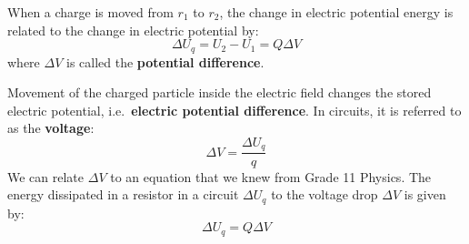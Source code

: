 \begin{figure}[ht]
  \centering
\end{figure}
When a charge is moved from $r_1$ to $r_2$, the change in electric potential
energy is related to the change in electric potential by:
\begin{equation}
  \Delta U_q=U_2-U_1=Q\Delta V
\end{equation}
where $\Delta V$ is called the \textbf{potential difference}.
  


Movement of the charged particle inside the electric field changes the
stored electric potential, i.e.\ \textbf{electric potential difference}. In
circuits, it is referred to as the \textbf{voltage}:
\begin{equation}
  \boxed{\Delta V=\frac{\Delta U_q}q}
\end{equation}
We can relate $\Delta V$ to an equation that we knew from Grade 11 Physics.
The energy dissipated in a resistor in a circuit $\Delta U_q$ to the voltage
drop $\Delta V$ is given by:
\begin{equation}
  \Delta U_q=Q\Delta V
\end{equation}





